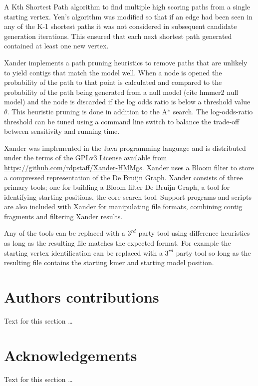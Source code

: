 \documentclass[10pt]{bmc_article}
\newenvironment{bmcformat}{\begin{raggedright}\baselineskip20pt\sloppy\setboolean{publ}{false}}{\end{raggedright}\baselineskip20pt\sloppy}
\begin{document}
\begin{bmcformat}
A Kth Shortest Path algorithm\cite{Yen1971}\cite{Lawler1972} to find multiple high scoring paths from a single starting vertex.  Yen's algorithm was modified so that if an edge had been seen in any of the K-1 shortest paths it was not considered in subsequent candidate generation iterations.  This ensured that each next shortest path generated contained at least one new vertex.

Xander implements a path pruning heuristics to remove paths that are unlikely to yield contigs that match the model well.  When a node is opened the probability of the path to that point is calculated and compared to the probability of the path being generated from a null model (cite hmmer2 null model) and the node is discarded if the log odds ratio is below a threshold value $\theta$. This heuristic pruning is done in addition to the A* search. The log-odds-ratio threshold can be tuned using a command line switch to balance the trade-off between sensitivity and running time.
  
Xander was implemented in the Java programming language and is distributed under the terms of the GPLv3 License available from \url{https://github.com/rdpstaff/Xander-HMMgs}.  Xander uses a Bloom filter to store a compressed representation of the De Bruijn Graph. Xander consists of three primary tools; one for building a Bloom filter De Bruijn Graph, a tool for identifying starting positions, the core search tool. Support programs and scripts are also included with Xander for manipulating file formats, combining contig fragments and filtering Xander results.

Any of the tools can be replaced with a $3^{rd}$ party tool using difference heuristics as long as the resulting file matches the expected format.  For example the starting vertex identification can be replaced with a $3^{rd}$ party tool so long as the resulting file contains the starting kmer and starting model position.
    
\section*{Authors contributions}
    Text for this section \ldots

    

\section*{Acknowledgements}
  Text for this section \ldots



\end{bmcformat}
\end{document}
